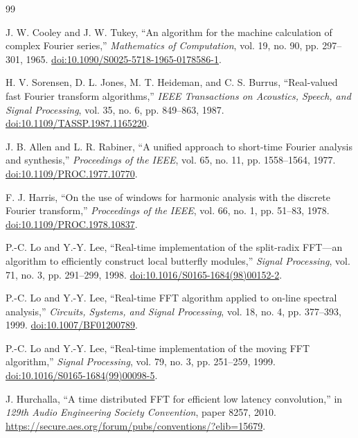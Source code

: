 \documentclass[11pt,letterpaper]{article}
\begin{document}
\begin{thebibliography}{99}
\small\raggedright
{}
J. W. Cooley and J. W. Tukey, ``An algorithm for the machine calculation of
complex Fourier series,'' \emph{Mathematics of Computation}, vol. 19, no. 90,
pp. 297--301, 1965. \href{https://doi.org/10.1090/S0025-5718-1965-0178586-1}{doi:10.1090/S0025-5718-1965-0178586-1}.

H. V. Sorensen, D. L. Jones, M. T. Heideman, and C. S. Burrus,
``Real-valued fast Fourier transform algorithms,'' \emph{IEEE Transactions
on Acoustics, Speech, and Signal Processing}, vol. 35, no. 6, pp. 849--863,
1987. \href{https://doi.org/10.1109/TASSP.1987.1165220}{doi:10.1109/TASSP.1987.1165220}.

J. B. Allen and L. R. Rabiner, ``A unified approach to short-time Fourier
analysis and synthesis,'' \emph{Proceedings of the IEEE}, vol. 65, no. 11,
pp. 1558--1564, 1977.
\href{https://doi.org/10.1109/PROC.1977.10770}{doi:10.1109/PROC.1977.10770}.

F. J. Harris, ``On the use of windows for harmonic analysis with the discrete
Fourier transform,'' \emph{Proceedings of the IEEE}, vol. 66, no. 1,
pp. 51--83, 1978.
\href{https://doi.org/10.1109/PROC.1978.10837}{doi:10.1109/PROC.1978.10837}.

P.-C. Lo and Y.-Y. Lee, ``Real-time implementation of the split-radix FFT---an
algorithm to efficiently construct local butterfly modules,''
\emph{Signal Processing}, vol. 71, no. 3, pp. 291--299, 1998.
\href{https://doi.org/10.1016/S0165-1684(98)00152-2}{doi:10.1016/S0165-1684(98)00152-2}.

P.-C. Lo and Y.-Y. Lee, ``Real-time FFT algorithm applied to on-line spectral
analysis,'' \emph{Circuits, Systems, and Signal Processing}, vol. 18, no. 4,
pp. 377--393, 1999.
\href{https://doi.org/10.1007/BF01200789}{doi:10.1007/BF01200789}.

P.-C. Lo and Y.-Y. Lee, ``Real-time implementation of the moving FFT
algorithm,'' \emph{Signal Processing}, vol. 79, no. 3, pp. 251--259, 1999.
\href{https://doi.org/10.1016/S0165-1684(99)00098-5}{doi:10.1016/S0165-1684(99)00098-5}.

J. Hurchalla, ``A time distributed FFT for efficient low latency convolution,''
in \emph{129th Audio Engineering Society Convention}, paper 8257, 2010.
\url{https://secure.aes.org/forum/pubs/conventions/?elib=15679}.


\end{thebibliography}
\end{document}

